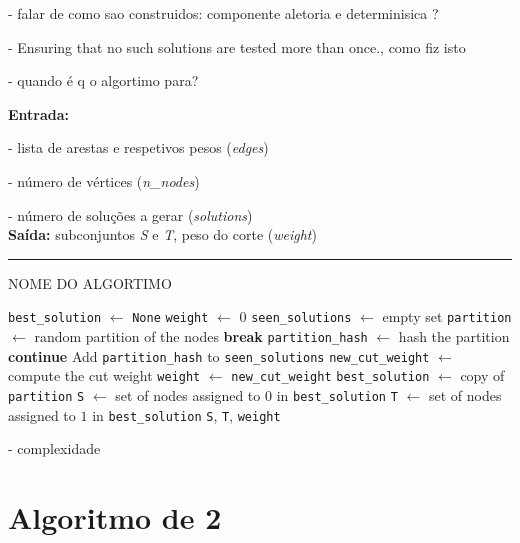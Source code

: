 \documentclass[mirror, portugues]{revdetua}
\begin{document}
- falar de como sao construidos: componente aletoria e determinisica ?

- Ensuring that no such solutions are tested more than once., como fiz isto

- quando é q o algortimo para?






\begin{algorithm}[H]
\raggedright
\textbf{Entrada:}

- lista de arestas e respetivos pesos (\textit{edges})

- número de vértices (\textit{n\_nodes})

- número de soluções a gerar (\textit{solutions})\\
\textbf{Saída:} subconjuntos \textit{S} e \textit{T}, peso do corte (\textit{weight}) \\
\hrule 
\caption{NOME DO ALGORTIMO}
\begin{algorithmic}[1]
    \State \texttt{best\_solution} $\gets$ \texttt{None}
    \State \texttt{weight} $\gets$ 0
    \State \texttt{seen\_solutions} $\gets$ empty set
        \State \texttt{partition} $\gets$ random partition of the nodes
            \State \textbf{break}
        \EndIf
        \State \texttt{partition\_hash} $\gets$ hash the partition
            \State \textbf{continue}
        \EndIf
        \State Add \texttt{partition\_hash} to \texttt{seen\_solutions}
        \State \texttt{new\_cut\_weight} $\gets$ compute the cut weight
            \State \texttt{weight} $\gets$ \texttt{new\_cut\_weight}
            \State \texttt{best\_solution} $\gets$ copy of \texttt{partition}
        \EndIf
    \EndFor
    \State \texttt{S} $\gets$ set of nodes assigned to $0$ in \texttt{best\_solution}
    \State \texttt{T} $\gets$ set of nodes assigned to $1$ in \texttt{best\_solution}
    \Return \texttt{S}, \texttt{T}, \texttt{weight}
\end{algorithmic}
\end{algorithm}
    


- complexidade

\section{Algoritmo de 2}
\end{document}
